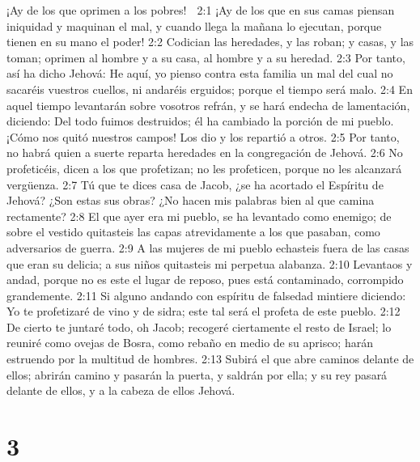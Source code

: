 ¡Ay de los que oprimen a los pobres!  

2:1 ¡Ay de los que en sus camas piensan iniquidad y maquinan el mal, y cuando llega la mañana lo ejecutan, porque tienen en su mano el poder!  
2:2 Codician las heredades, y las roban; y casas, y las toman; oprimen al hombre y a su casa, al hombre y a su heredad.  
2:3 Por tanto, así ha dicho Jehová: He aquí, yo pienso contra esta familia un mal del cual no sacaréis vuestros cuellos, ni andaréis erguidos; porque el tiempo será malo.  
2:4 En aquel tiempo levantarán sobre vosotros refrán, y se hará endecha de lamentación, diciendo: Del todo fuimos destruidos; él ha cambiado la porción de mi pueblo. ¡Cómo nos quitó nuestros campos! Los dio y los repartió a otros.  
2:5 Por tanto, no habrá quien a suerte reparta heredades en la congregación de Jehová.  
2:6 No profeticéis, dicen a los que profetizan; no les profeticen, porque no les alcanzará vergüenza.  
2:7 Tú que te dices casa de Jacob, ¿se ha acortado el Espíritu de Jehová? ¿Son estas sus obras? ¿No hacen mis palabras bien al que camina rectamente?  
2:8 El que ayer era mi pueblo, se ha levantado como enemigo; de sobre el vestido quitasteis las capas atrevidamente a los que pasaban, como adversarios de guerra.  
2:9 A las mujeres de mi pueblo echasteis fuera de las casas que eran su delicia; a sus niños quitasteis mi perpetua alabanza.  
2:10 Levantaos y andad, porque no es este el lugar de reposo, pues está contaminado, corrompido grandemente.  
2:11 Si alguno andando con espíritu de falsedad mintiere diciendo: Yo te profetizaré de vino y de sidra; este tal será el profeta de este pueblo.  
2:12 De cierto te juntaré todo, oh Jacob; recogeré ciertamente el resto de Israel; lo reuniré como ovejas de Bosra, como rebaño en medio de su aprisco; harán estruendo por la multitud de hombres.  
2:13 Subirá el que abre caminos delante de ellos; abrirán camino y pasarán la puerta, y saldrán por ella; y su rey pasará delante de ellos, y a la cabeza de ellos Jehová.  

\chapter{3}

